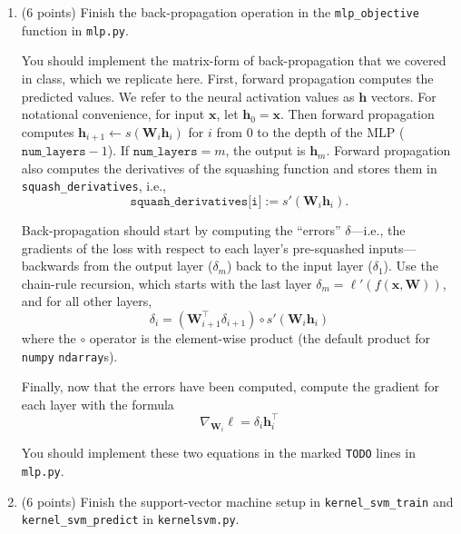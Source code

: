 \documentclass[10pt]{article}
\newcommand{\bx}{{\boldsymbol x}}
\newcommand{\bh}{{\boldsymbol h}}
\newcommand{\bW}{{\mathbf W}}
\begin{document}
\begin{enumerate}

\item (6 points) Finish the back-propagation operation in the \texttt{mlp\_objective} function in \texttt{mlp.py}. 

You should implement the matrix-form of back-propagation that we covered in class, which we replicate here. First, forward propagation computes the predicted values. We refer to the neural activation values as $\bh$ vectors. For notational convenience, for input $\bx$, let $\bh_0 = \bx$. Then forward propagation computes $\bh_{i+1} \leftarrow s\left( \bW_i \bh_{i} \right)$ for $i$ from $0$ to the depth of the MLP ($\texttt{num\_layers} - 1$). If $\texttt{num\_layers} = m$, the output is $\bh_m$. Forward propagation also computes the derivatives of the squashing function and stores them in \texttt{squash\_derivatives}, i.e., 
\[
\texttt{squash\_derivatives[i]} := s'\left(\bW_i \bh_{i}\right).
\]

Back-propagation should start by computing the ``errors'' $\delta$---i.e., the gradients of the loss with respect to each layer's pre-squashed inputs---backwards from the output layer ($\delta_m$) back to the input layer ($\delta_1$). Use the chain-rule recursion, which starts with the last layer $\delta_m = \ell'(f(\bx, \bW))$, and for all other layers,
\begin{equation}
\delta_i = \left( \bW_{i+1}^\top \delta_{i+1} \right) \circ s'\left( \bW_i \bh_{i} \right)
\end{equation}
where the $\circ$ operator is the element-wise product (the default product for \texttt{numpy} \texttt{ndarray}s).

Finally, now that the errors have been computed, compute the gradient for each layer with the formula
\begin{equation}
\nabla_{\bW_i} \ell = \delta_i \bh_{i}^\top
\end{equation}

You should implement these two equations in the marked \texttt{TODO} lines in \texttt{mlp.py}.

\item (6 points) Finish the support-vector machine setup in \texttt{kernel\_svm\_train} and \texttt{kernel\_svm\_predict} in \texttt{kernelsvm.py}. 


\end{enumerate}
\end{document}
